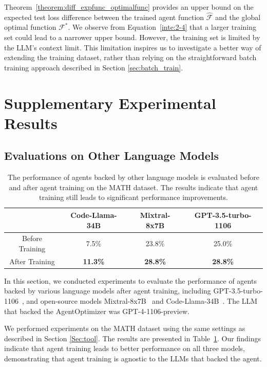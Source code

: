 \documentclass{article}
\theoremstyle{plain}
\theoremstyle{definition}
\theoremstyle{remark}
\begin{document}
Theorem~\ref{theorem:diff_expfunc_optimalfunc} provides an upper bound on the expected test loss difference between the trained agent function $\mathcal{\hat{F}}$ and the global optimal function $\mathcal{F^*}$. We observe from Equation~\ref{inte:2-4} that a larger training set could lead to a narrower upper bound. However, the training set is limited by the LLM’s context limit. This limitation inspires us to investigate a better way of extending the training dataset, rather than relying on the straightforward batch training approach described in Section \ref{sec:batch_train}.

\section{Supplementary Experimental Results}

\subsection{Evaluations on Other Language Models}

\begin{table}[htb]
\centering
\setlength{\tabcolsep}{10pt} 
\begin{tabular}{cccc}
\toprule[1.5pt]
               & Code-Llama-34B & Mixtral-8x7B & GPT-3.5-turbo-1106  \\ \hline
Before Training & 7.5\%   &  23.8\%  &  25.0\%                                           \\ \hline
After Training & \textbf{11.3\%}     & \textbf{28.8\%} &  \textbf{28.8\%}                               \\ \bottomrule[1.5pt]
\end{tabular}
\caption{
The performance of agents backed by other language models is evaluated before and after agent training on the MATH dataset. The results indicate that agent training still leads to significant performance improvements.
}
\label{diff_models}
\end{table}

In this section, we conducted experiments to evaluate the performance of agents backed by various language models after agent training, including GPT-3.5-turbo-1106~\cite{openai2022gpt}, and open-source models Mixtral-8x7B~\cite{jiang2024mixtral,jiang2023mistral} and Code-Llama-34B~\cite{roziere2023code,jayaseelanllama}. The LLM that backed the AgentOptimizer was GPT-4-1106-preview.

We performed experiments on the MATH dataset using the same settings as described in Section \ref{Sec:tool}. The results are presented in Table~\ref{diff_models}.
Our findings indicate that agent training leads to better performance on all three models, demonstrating that agent training is agnostic to the LLMs that backed the agent.
\end{document}
